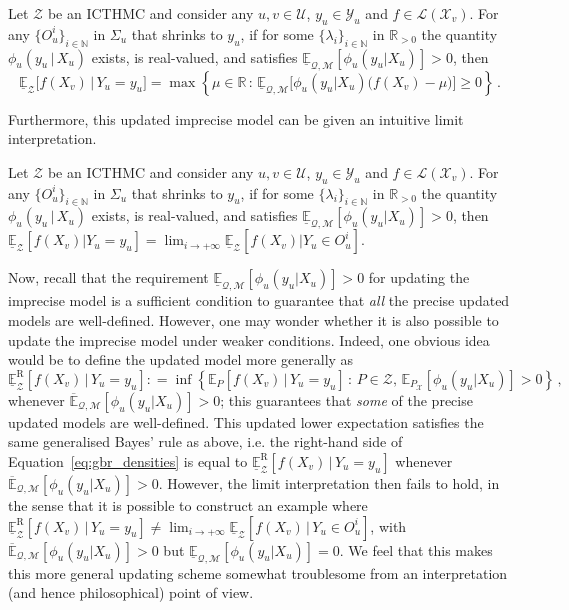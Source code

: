 \documentclass[twoside,11pt]{article}
\newcommand{\nats}{\mathbb{N}}
\newcommand{\reals}{\mathbb{R}}
\newcommand{\realspos}{\reals_{>0}}
\newcommand{\states}{\mathcal{X}}
\newcommand{\observs}{\mathcal{Y}}
\newcommand{\lexp}{\underline{\mathbb{E}}_{\rateset,\mathcal{M}}}
\newcommand{\uexp}{\overline{\mathbb{E}}_{\rateset,\mathcal{M}}}
\newcommand{\gambles}{\mathcal{L}}
\newcommand{\rateset}{\mathcal{Q}}
\newcommand{\coloneqq}{:\!=}
\begin{document}
\begin{proposition}\label{prop:GBR_for_densities_lower_zero}
Let $\mathcal{Z}$ be an ICTHMC and consider any $u,v\in\mathcal{U}$, $y_u\in\observs_u$ and $f\in\gambles(\states_v)$. For any $\{O_u^i\}_{i\in\nats}$ in $\Sigma_u$ that shrinks to $y_u$, if for some $\{\lambda_i\}_{i\in\nats}$ in $\realspos$ the quantity $\phi_u(y_u\,\vert\,X_u)$ exists, is real-valued, and satisfies $\lexp[\phi_u(y_u\vert X_u)]>0$, then
\begin{equation}\label{eq:gbr_densities}
\underline{\mathbb{E}}_{\mathcal{Z}}\bigl[f(X_v)\,\vert\,Y_u = y_u\bigr] = \max\left\{\mu\in\reals\,:\, \lexp\bigl[\phi_u(y_u\vert X_u)\bigl(f(X_v) - \mu\bigr)\bigr] \geq 0\right\}\,.
\end{equation}
\end{proposition}
Furthermore, this updated imprecise model can be given an intuitive limit interpretation.
\begin{proposition}\label{prop:GBR_for_densities_is_limit_if_continuous}
Let $\mathcal{Z}$ be an ICTHMC and consider any $u,v\in\mathcal{U}$, $y_u\in\observs_u$ and $f\in\gambles(\states_v)$. For any $\{O_u^i\}_{i\in\nats}$ in $\Sigma_u$ that shrinks to $y_u$, if for some $\{\lambda_i\}_{i\in\nats}$ in $\realspos$ the quantity $\phi_u(y_u\,\vert\,X_u)$ exists, is real-valued, and satisfies $\lexp[\phi_u(y_u\vert X_u)]>0$, then $\underline{\mathbb{E}}_\mathcal{Z}[f(X_v)\vert Y_u=y_u] 
 = \lim_{i\to+\infty}\underline{\mathbb{E}}_\mathcal{Z}[f(X_v)\vert Y_u\in O_u^i]$.
\end{proposition}

Now, recall that the requirement $\lexp[\phi_u(y_u\vert X_u)]>0$ for updating the imprecise model is a sufficient condition to guarantee that \emph{all} the precise updated models are well-defined. However, one may wonder whether it is also possible to update the imprecise model under weaker conditions. Indeed, one obvious idea would be to define the updated model more generally as
\begin{equation*}
\underline{\mathbb{E}}_\mathcal{Z}^\mathrm{R}[f(X_v)\,\vert\,Y_u=y_u] \coloneqq \inf\left\{ \mathbb{E}_P[f(X_v)\,\vert\,Y_u=y_u]\,:\, P\in\mathcal{Z},\,\mathbb{E}_{P_\states}[\phi_u(y_u\vert X_u)]>0 \right\}\,,
\end{equation*}
whenever $\uexp[\phi_u(y_u\vert X_u)]>0$; this guarantees that \emph{some} of the precise updated models are well-defined. This updated lower expectation satisfies the same generalised Bayes' rule as above, i.e. the right-hand side of Equation~\eqref{eq:gbr_densities} is equal to $\underline{\mathbb{E}}_\mathcal{Z}^\mathrm{R}[f(X_v)\,\vert\,Y_u=y_u]$ whenever $\uexp[\phi_u(y_u\vert X_u)]>0$. However, the limit interpretation then fails to hold, in the sense that it is possible to construct an example where $\underline{\mathbb{E}}_\mathcal{Z}^\mathrm{R}[f(X_v)\,\vert\,Y_u=y_u] \neq \lim_{i\to+\infty} \underline{\mathbb{E}}_\mathcal{Z}[f(X_v)\,\vert\,Y_u\in O_u^i]$, with $\uexp[\phi_u(y_u\vert X_u)]>0$ but $\lexp[\phi_u(y_u\vert X_u)]=0$. We feel that this makes this more general updating scheme somewhat troublesome from an interpretation (and hence philosophical) point of view.
\end{document}

